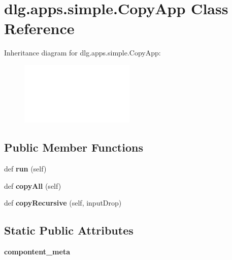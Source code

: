 \hypertarget{classdlg_1_1apps_1_1simple_1_1_copy_app}{}\section{dlg.\+apps.\+simple.\+Copy\+App Class Reference}
\label{classdlg_1_1apps_1_1simple_1_1_copy_app}
Inheritance diagram for dlg.\+apps.\+simple.\+Copy\+App\+:\begin{figure}[H]
\begin{center}
\leavevmode
\includegraphics[height=3.000000cm]{classdlg_1_1apps_1_1simple_1_1_copy_app}
\end{center}
\end{figure}
\subsection*{Public Member Functions}
\begin{DoxyCompactItemize}
\item 
\mbox{\label{classdlg_1_1apps_1_1simple_1_1_copy_app_ad16fe55a07097d0992c9ab4f522750b1}} 
def {\bfseries run} (self)
\item 
\mbox{\label{classdlg_1_1apps_1_1simple_1_1_copy_app_ab6e819bb8b40bdbc99e394f330d6cd6a}} 
def {\bfseries copy\+All} (self)
\item 
\mbox{\label{classdlg_1_1apps_1_1simple_1_1_copy_app_a43b5e8973927cd74a1f2121152141408}} 
def {\bfseries copy\+Recursive} (self, input\+Drop)
\end{DoxyCompactItemize}
\subsection*{Static Public Attributes}
\begin{DoxyCompactItemize}
\item 
{\bfseries compontent\+\_\+meta}
\end{DoxyCompactItemize}


